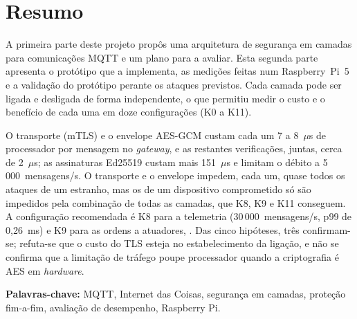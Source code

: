 \section*{Resumo}

A primeira parte deste projeto propôs uma arquitetura de segurança em camadas para
comunicações MQTT e um plano para a avaliar. Esta segunda parte apresenta o
protótipo que a implementa, as medições feitas num Raspberry~Pi~5 e a validação do
protótipo perante os ataques previstos. Cada camada pode ser ligada e desligada de
forma independente, o que permitiu medir o custo e o benefício de cada uma em doze
configurações (K0 a K11). 

O transporte (mTLS) e o envelope AES-GCM custam cada um 7 a 8~$\mu$s de
processador por mensagem no \emph{gateway}, e as restantes verificações, juntas,
cerca de 2~$\mu$s; as assinaturas Ed25519 custam mais 151~$\mu$s e limitam o
débito a 5\,000~mensagens/s. O transporte e o envelope impedem, cada um, quase
todos os ataques de um estranho, mas os de um dispositivo comprometido só são
impedidos pela combinação de todas as camadas, que K8, K9 e K11 conseguem. A
configuração recomendada é K8 para a telemetria (30\,000~mensagens/s, p99 de
0,26~ms) e K9 para as ordens a atuadores, . Das cinco
hipóteses, três confirmam-se; refuta-se que o custo
do TLS esteja no estabelecimento da ligação, e não se confirma que a limitação de tráfego poupe
processador quando a criptografia é AES em \emph{hardware}. 

\medskip
\noindent\textbf{Palavras-chave:} MQTT, Internet das Coisas, segurança em camadas,
proteção fim-a-fim, avaliação de desempenho, Raspberry Pi.
